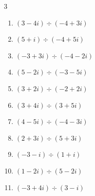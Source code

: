 \begin{multicols}{3}
\begin{enumerate}

  \item $\displaystyle (3-4i)\div(-4+3i)$


  \item $\displaystyle (5+i)\div(-4+5i)$


  \item $\displaystyle (-3+3i)\div(-4-2i)$


  \item $\displaystyle (5-2i)\div(-3-5i)$


  \item $\displaystyle (3+2i)\div(-2+2i)$


  \item $\displaystyle (3+4i)\div(3+5i)$


\columnbreak %

  \item $\displaystyle (4-5i)\div(-4-3i)$


  \item $\displaystyle (2+3i)\div(5+3i)$


  \item $\displaystyle (-3-i)\div(1+i)$

        \phantom{$\displaystyle =-2+i$}

  \item $\displaystyle (1-2i)\div(5-2i)$


  \item $\displaystyle (-3+4i)\div(3-i)$



\end{enumerate}
\end{multicols}
